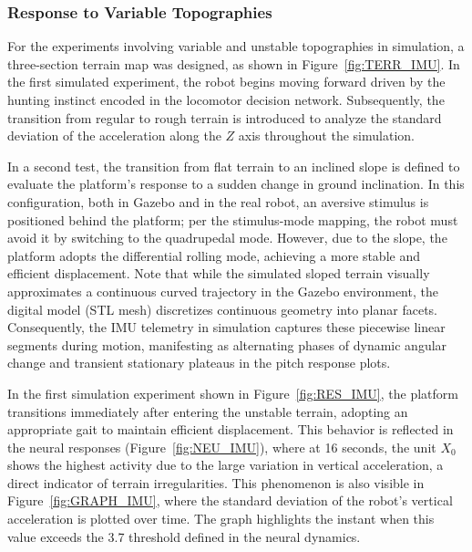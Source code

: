 \subsubsection{Response to Variable Topographies}

For the experiments involving variable and unstable topographies in simulation, a three-section terrain map was designed, as shown in Figure~\ref{fig:TERR_IMU}. In the first simulated experiment, the robot begins moving forward driven by the hunting instinct encoded in the locomotor decision network. Subsequently, the transition from regular to rough terrain is introduced to analyze the standard deviation of the acceleration along the $Z$ axis throughout the simulation.  

In a second test, the transition from flat terrain to an inclined slope is defined to evaluate the platform's response to a sudden change in ground inclination. In this configuration, both in Gazebo and in the real robot, an aversive stimulus is positioned behind the platform; per the stimulus-mode mapping, the robot must avoid it by switching to the quadrupedal mode. However, due to the slope, the platform adopts the differential rolling mode, achieving a more stable and efficient displacement. Note that while the simulated sloped terrain visually approximates a continuous curved trajectory in the Gazebo environment, the digital model (STL mesh) discretizes continuous geometry into planar facets. Consequently, the IMU telemetry in simulation captures these piecewise linear segments during motion, manifesting as alternating phases of dynamic angular change and transient stationary plateaus in the pitch response plots.

In the first simulation experiment shown in Figure~\ref{fig:RES_IMU}, the platform transitions immediately after entering the unstable terrain, adopting an appropriate gait to maintain efficient displacement. This behavior is reflected in the neural responses (Figure~\ref{fig:NEU_IMU}), where at 16 seconds, the unit $X_{0}$ shows the highest activity due to the large variation in vertical acceleration, a direct indicator of terrain irregularities. This phenomenon is also visible in Figure~\ref{fig:GRAPH_IMU}, where the standard deviation of the robot's vertical acceleration is plotted over time. The graph highlights the instant when this value exceeds the 3.7 threshold defined in the neural dynamics.

